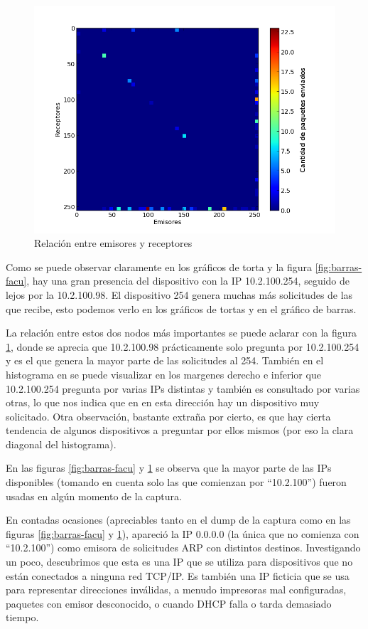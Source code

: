 \begin{figure}[!h]
  \includegraphics[width=\textwidth,keepaspectratio]{graph/hist2d-facu.png}
  \caption{Relación entre emisores y receptores}
  \label{fig:hist2d-facu}
\end{figure}

Como se puede observar claramente en los gráficos de torta y la figura
\ref{fig:barras-facu}, hay una gran presencia del dispositivo con la IP
10.2.100.254, seguido de lejos por la 10.2.100.98. El dispositivo 254 genera muchas más solicitudes de las que recibe, esto podemos verlo en los gr\'aficos de tortas y en el gr\'afico de barras.

La relaci\'on entre estos dos nodos m\'as importantes se puede aclarar con la figura \ref{fig:hist2d-facu}, donde se
aprecia que 10.2.100.98 prácticamente solo pregunta por 10.2.100.254 y es el que genera la mayor parte de las solicitudes al 254.
También en el histograma en se puede visualizar en los margenes derecho e inferior que 10.2.100.254 pregunta por
varias IPs distintas y también es consultado por varias otras, lo que nos indica que en en esta dirección hay un dispositivo muy solicitado. Otra observación,
bastante extraña por cierto, es que hay cierta tendencia de algunos dispositivos
a preguntar por ellos mismos (por eso la clara diagonal del histograma).

En las figuras \ref{fig:barras-facu} y \ref{fig:hist2d-facu} se observa
que la mayor parte de las IPs disponibles (tomando en cuenta solo las que
comienzan por ``10.2.100'') fueron usadas en algún momento de la captura.

En contadas ocasiones (apreciables tanto en el dump de la captura
como en las figuras \ref{fig:barras-facu} y \ref{fig:hist2d-facu}), apareció la
IP 0.0.0.0 (la única que no comienza con ``10.2.100'') como emisora de
solicitudes ARP con distintos destinos. Investigando un poco, descubrimos que
esta es una IP que se utiliza para dispositivos que no están conectados a
ninguna red TCP/IP. Es también una IP ficticia que se usa para representar
direcciones inválidas, a menudo impresoras mal configuradas, paquetes con emisor
desconocido, o cuando DHCP falla o tarda demasiado tiempo.

